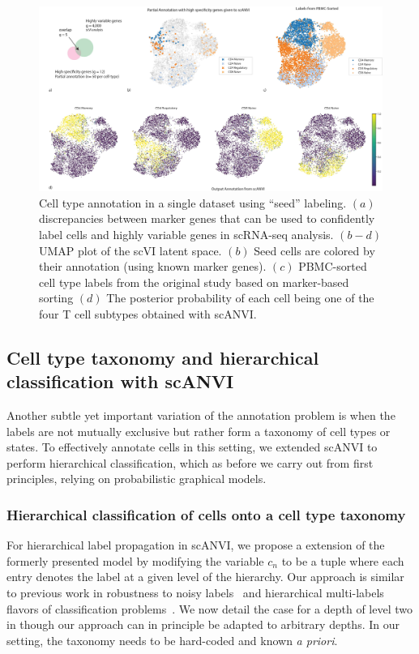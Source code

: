 \begin{figure}[ht]
\centering
\includegraphics[width=\textwidth]{figures/scanvi.jpg}
\caption[Cell type annotation in a single dataset using ``seed'' labeling]{Cell type annotation in a single dataset using ``seed'' labeling. $(a)$ discrepancies between marker genes that can be used to confidently label cells and highly variable genes in scRNA-seq analysis. $(b-d)$ UMAP plot of the scVI latent space. $(b)$ Seed cells are colored by their annotation (using known marker genes). $(c)$ PBMC-sorted cell type labels from the original study based on marker-based sorting $(d)$ The posterior probability of each cell being one of the four T cell subtypes obtained with scANVI.}
\label{scanviscanvi_panel}
\end{figure}


\subsection{Cell type taxonomy and hierarchical classification with scANVI}
Another subtle yet important variation of the annotation problem is when the labels are not mutually exclusive but rather form a taxonomy of cell types or states. To effectively annotate cells in this setting, we extended scANVI to perform hierarchical classification, which as before we carry out from first principles, relying on probabilistic graphical models. 

\subsubsection{Hierarchical classification of cells onto a cell type taxonomy}
For hierarchical label propagation in scANVI, we propose a extension of the formerly presented model by modifying the variable $c_n$ to be a tuple where each entry denotes the label at a given level of the hierarchy. Our approach is similar to previous work in robustness to noisy labels~\cite{goldberger2016training} and hierarchical multi-labels flavors of classification problems~\cite{pmlr-v80-wehrmann18a}. We now detail the case for a depth of level two in though our approach can in principle be adapted to arbitrary depths. In our setting, the taxonomy needs to be hard-coded and known \textit{a priori}.

